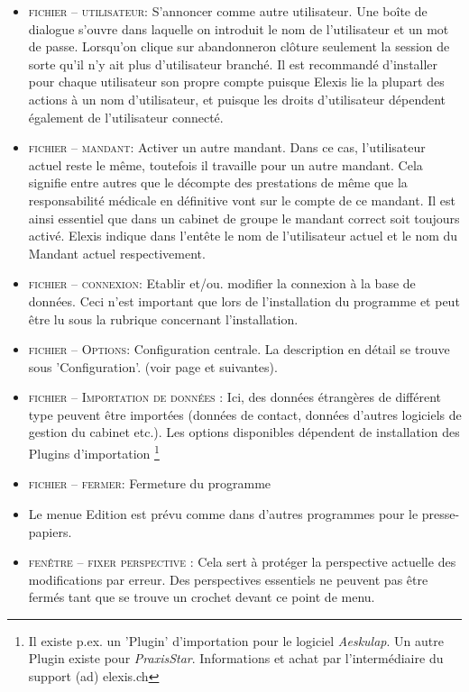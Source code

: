 \begin{itemize}
  \item {\textsc{fichier -- utilisateur}: S'annoncer comme autre utilisateur. Une boîte de dialogue s'ouvre dans laquelle on introduit le nom de l'utilisateur et un mot de passe.
Lorsqu'on clique sur  \glqq abandonner\grqq{}on clôture seulement la session de sorte qu'il n'y ait plus d'utilisateur branché. Il est recommandé d'installer pour chaque utilisateur son propre compte puisque Elexis lie la plupart des actions à un nom d'utilisateur, et puisque les droits d'utilisateur dépendent également de l'utilisateur connecté.}
  \item {\textsc{fichier -- mandant}: Activer un autre mandant. Dans ce cas, l'utilisateur actuel reste le même, toutefois il travaille pour un autre mandant. Cela signifie entre autres que le décompte des prestations de même que la responsabilité médicale en définitive vont sur le compte de ce mandant. Il est ainsi essentiel que dans un cabinet de groupe le mandant correct soit toujours activé. Elexis indique dans l'entête le nom de l'utilisateur actuel et le nom du Mandant actuel respectivement.}
  \item {\textsc{fichier -- connexion}: Etablir et/ou. modifier la connexion à la base de données.
Ceci n'est important que lors de l'installation du programme et peut être lu sous la rubrique concernant l'installation.}
  \item {\textsc{fichier -- Options}: Configuration centrale. La description en détail se trouve sous 'Configuration'.  (voir page \pageref{settings} et suivantes).}
  \item {\textsc{fichier -- Importation de données }: Ici, des données étrangères de différent type peuvent être importées (données de contact, données d'autres logiciels de gestion du cabinet etc.). Les options disponibles dépendent de installation des Plugins d'importation} \footnote{Il existe p.ex. un 'Plugin' d'importation pour le logiciel \textit{Aeskulap}. Un autre Plugin existe pour \textit{PraxisStar}. Informations et achat par l'intermédiaire du support (ad) elexis.ch}
  \item {\textsc{fichier -- fermer}: Fermeture du programme}
  \item {Le menue \glqq Edition\grqq{} est prévu comme dans d'autres programmes pour le presse-papiers.}
  \item {\textsc{fenêtre -- fixer perspective }: Cela sert à protéger la perspective actuelle des modifications par erreur. Des perspectives essentiels ne peuvent pas être fermés tant que se trouve un crochet devant ce point de menu.}

\end{itemize}
